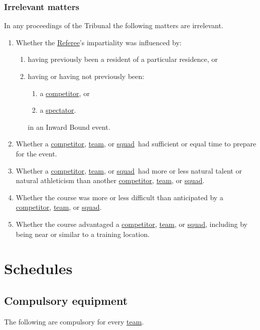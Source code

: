 \documentclass[12pt]{report}
\renewcommand\thesection{\arabic{section}}
\newcommand{\hyplink}[1]{\hyperlink{#1}{{#1}}}
\newcommand\amended{%
}
\newcommand{\competitor}{\hyplink{competitor}}
\newcommand{\Referee}{\hyplink{Referee}}
\newcommand{\spectator}{\hyplink{spectator}}
\newcommand{\squad}{\hyplink{squad}}
\newcommand{\team}{\hyplink{team}}
\begin{document}
  \section{Irrelevant matters}
  \amended
  \begin{fenumerate}
    \item In any proceedings of the Tribunal the following matters are irrelevant.
    \begin{enumerate}
      \item Whether the \Referee's impartiality was influenced by:
      \begin{enumerate}
    \item having previously been a resident of a particular residence, or
    \item having or having not previously been:
    \begin{enumerate}
      \item a \competitor, or
      \item a \spectator.
    \end{enumerate}
    in an Inward Bound event.
  \end{enumerate}
  \item Whether a \competitor, \team, or \squad\ had sufficient or equal time to prepare for the event.
  \item Whether a \competitor, \team, or \squad\ had more or less natural talent or natural athleticism than another \competitor, \team, or \squad.
  \item Whether the course was more or less difficult than anticipated by a \competitor, \team, or \squad.
  \item Whether the course advantaged a \competitor, \team, or \squad, including by being near or similar to a training location.
    \end{enumerate}
  \end{fenumerate}

\cleardoublepage
  \appendix
  \part{Schedules}
  \renewcommand\thesection{}
  \renewcommand\appendixname{Schedule}
  \chapter{Compulsory equipment}\label{Sch:CompulsoryEquipment}
  The following are compulsory for every \team.
\end{document}
